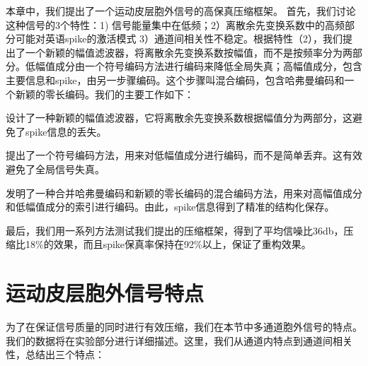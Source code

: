 本章中，我们提出了一个运动皮层胞外信号的高保真压缩框架。 首先，我们讨论这种信号的3个特性：1) 信号能量集中在低频；2）离散余先变换系数中的高频部分可能对英语spike的激活模式 3）通道间相关性不稳定。根据特性（2），我们提出了一个新颖的幅值滤波器，将离散余先变换系数按幅值，而不是按频率分为两部分。低幅值成分由一个符号编码方法进行编码来降低全局失真；高幅值成分，包含主要信息和spike，由另一步骤编码。这个步骤叫混合编码，包含哈弗曼编码和一个新颖的零长编码。我们的主要工作如下：

\begin{list}{-}
\item 设计了一种新颖的幅值滤波器，它将离散余先变换系数根据幅值分为两部分，这避免了spike信息的丢失。
\item 提出了一个符号编码方法，用来对低幅值成分进行编码，而不是简单丢弃。这有效避免了全局信号失真。 
\item 发明了一种合并哈弗曼编码和新颖的零长编码的混合编码方法，用来对高幅值成分和低幅值成分的索引进行编码。由此，spike信息得到了精准的结构化保存。
\end{list}




最后，我们用一系列方法测试我们提出的压缩框架，得到了平均信噪比36db，压缩比18\%的效果，而且spike保真率保持在92\%以上，保证了重构效果。





\section{运动皮层胞外信号特点}





为了在保证信号质量的同时进行有效压缩，我们在本节中多通道胞外信号的特点。我们的数据将在实验部分进行详细描述。这里，我们从通道内特点到通道间相关性，总结出三个特点：

